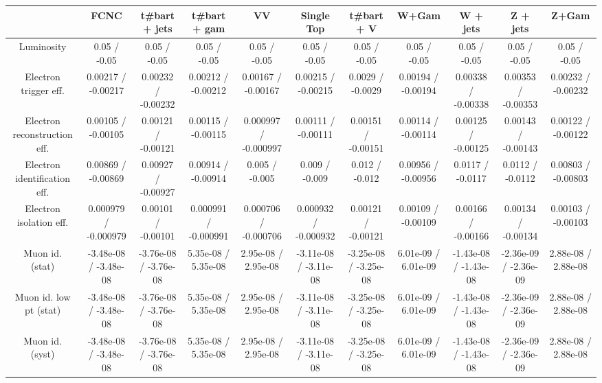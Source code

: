 \begin{table}[htbp]
\begin{center}
\footnotesize
\begin{tabular}{|c|c|c|c|c|c|c|c|c|c|c|}
\hline 
      & FCNC      & t#bar{t} + jets      & t#bar{t} +  gam      & VV      & Single Top      & t#bar{t} + V      & W+Gam      & W + jets      & Z + jets      & Z+Gam \\ 
\hline 
  Luminosity & 0.05 / -0.05 & 0.05 / -0.05 & 0.05 / -0.05 & 0.05 / -0.05 & 0.05 / -0.05 & 0.05 / -0.05 & 0.05 / -0.05 & 0.05 / -0.05 & 0.05 / -0.05 & 0.05 / -0.05 \\ 
  Electron trigger eff. & 0.00217 / -0.00217 & 0.00232 / -0.00232 & 0.00212 / -0.00212 & 0.00167 / -0.00167 & 0.00215 / -0.00215 & 0.0029 / -0.0029 & 0.00194 / -0.00194 & 0.00338 / -0.00338 & 0.00353 / -0.00353 & 0.00232 / -0.00232 \\ 
  Electron reconstruction eff. & 0.00105 / -0.00105 & 0.00121 / -0.00121 & 0.00115 / -0.00115 & 0.000997 / -0.000997 & 0.00111 / -0.00111 & 0.00151 / -0.00151 & 0.00114 / -0.00114 & 0.00125 / -0.00125 & 0.00143 / -0.00143 & 0.00122 / -0.00122 \\ 
  Electron identification eff. & 0.00869 / -0.00869 & 0.00927 / -0.00927 & 0.00914 / -0.00914 & 0.005 / -0.005 & 0.009 / -0.009 & 0.012 / -0.012 & 0.00956 / -0.00956 & 0.0117 / -0.0117 & 0.0112 / -0.0112 & 0.00803 / -0.00803 \\ 
  Electron isolation eff. & 0.000979 / -0.000979 & 0.00101 / -0.00101 & 0.000991 / -0.000991 & 0.000706 / -0.000706 & 0.000932 / -0.000932 & 0.00121 / -0.00121 & 0.00109 / -0.00109 & 0.00166 / -0.00166 & 0.00134 / -0.00134 & 0.00103 / -0.00103 \\ 
  Muon id. (stat) & -3.48e-08 / -3.48e-08 & -3.76e-08 / -3.76e-08 & 5.35e-08 / 5.35e-08 & 2.95e-08 / 2.95e-08 & -3.11e-08 / -3.11e-08 & -3.25e-08 / -3.25e-08 & 6.01e-09 / 6.01e-09 & -1.43e-08 / -1.43e-08 & -2.36e-09 / -2.36e-09 & 2.88e-08 / 2.88e-08 \\ 
  Muon id. low pt (stat) & -3.48e-08 / -3.48e-08 & -3.76e-08 / -3.76e-08 & 5.35e-08 / 5.35e-08 & 2.95e-08 / 2.95e-08 & -3.11e-08 / -3.11e-08 & -3.25e-08 / -3.25e-08 & 6.01e-09 / 6.01e-09 & -1.43e-08 / -1.43e-08 & -2.36e-09 / -2.36e-09 & 2.88e-08 / 2.88e-08 \\ 
  Muon id. (syst) & -3.48e-08 / -3.48e-08 & -3.76e-08 / -3.76e-08 & 5.35e-08 / 5.35e-08 & 2.95e-08 / 2.95e-08 & -3.11e-08 / -3.11e-08 & -3.25e-08 / -3.25e-08 & 6.01e-09 / 6.01e-09 & -1.43e-08 / -1.43e-08 & -2.36e-09 / -2.36e-09 & 2.88e-08 / 2.88e-08 \\ 

\end{tabular}
\end{center}
\end{table}
